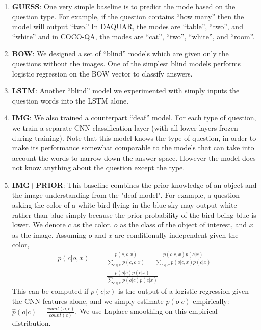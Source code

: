 \documentclass{article}
\renewcommand{\*}[1]{\textbf{#1}}
\begin{document}
\begin{enumerate}[leftmargin=*]
\item \*{GUESS}: One very simple baseline is to predict the mode based on the 
question type. For example, if the question contains ``how many'' then the 
model will output ``two.'' In DAQUAR, the modes are ``table'', ``two'', and 
``white'' and in COCO-QA, the modes are ``cat'', ``two'', ``white'', and 
``room''.

\item \*{BOW}: We designed a set of ``blind'' models which are given only the 
questions without the images. One of the simplest blind models performs 
logistic regression on the BOW vector to classify answers.

\item \*{LSTM}: Another ``blind'' model we experimented with simply inputs the 
question words into the LSTM alone.  

\item \*{IMG}: We also trained a counterpart ``deaf'' model. For each type of 
question, we train a separate CNN classification layer (with all lower layers 
frozen during training). Note that this model knows the type of question, in 
order to make its performance somewhat comparable to the models that can take 
into account the words to narrow down the answer space. However the model does 
not know anything about the question except the type. 

\item \*{IMG+PRIOR}: This baseline combines the prior knowledge of an object 
and the image understanding from the "deaf model". For example, a question 
asking the color of a white bird flying in the blue sky may output white rather 
than blue simply because the prior probability of the bird being blue is lower. 
We denote $c$ as the color, $o$ as the class of the object of interest, and $x$ 
as the image. Assuming $o$ and $x$ are conditionally independent given the 
color,
\begin{equation}
\begin{array}{lll}
p(c | o, x) & = & \frac{p(c, o | x)}{\sum_{c \in \mathcal{C}} p(c, o | x)} = 
\frac{p(o | c, x) p(c | x)}{\sum_{c \in \mathcal{C}} p(o | c, x) p(c | x)} \\
& = & \frac{p(o | c) p(c | x)}{\sum_{c \in \mathcal{C}}p(o | c) p(c | x)}
\end{array}
\end{equation}
This can be computed if $p(c | x)$ is the output of a logistic regression given 
the CNN features alone, and we simply estimate $p(o | c)$ empirically:
$\hat{p}(o | c) = \frac{count(o, c)}{count(c)}$. We use Laplace smoothing on 
this empirical distribution.
\end{enumerate}
\end{document}
